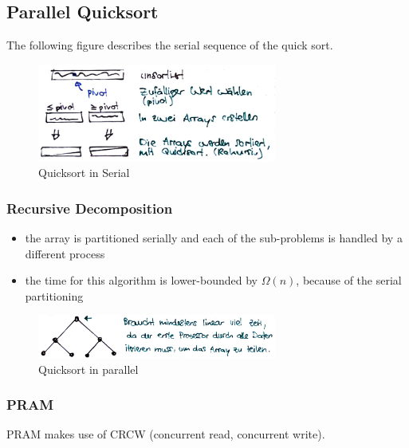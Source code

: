 \hypertarget{parallel-quicksort}{%
\subsection{Parallel Quicksort}\label{parallel-quicksort}}

The following figure describes the serial sequence of the quick sort.

\begin{figure}[H]
\centering
\includegraphics[width=0.7\textwidth]{figures/quicksort-serial.png}
\caption{Quicksort in Serial}
\end{figure}

\clearpage
\hypertarget{recursive-decomposition}{%
\subsubsection{Recursive Decomposition}\label{recursive-decomposition}}

\begin{itemize}
\tightlist
\item
  the array is partitioned serially and each of the sub-problems is
  handled by a different process
\item
  the time for this algorithm is lower-bounded by $\Omega(n)$, because of the serial partitioning
\end{itemize}

\begin{figure}[H]
\centering
\includegraphics[width=0.7\textwidth]{figures/quicksort-parallel.png}
\caption{Quicksort in parallel}
\end{figure}

\hypertarget{pram}{%
\subsubsection{PRAM}\label{pram}}

PRAM makes use of CRCW (concurrent read, concurrent write).

